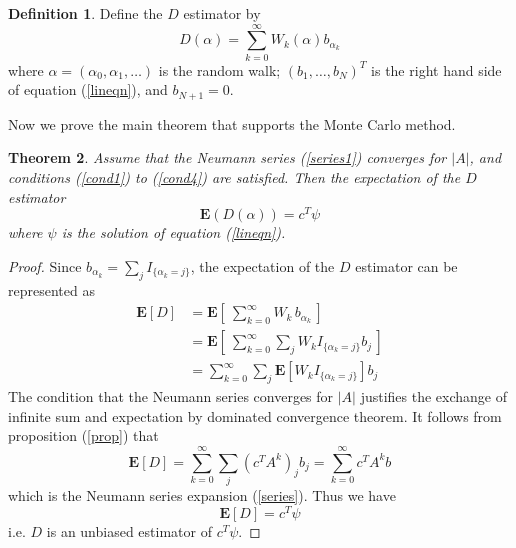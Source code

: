 \documentclass[a4paper,11pt]{article}
\newtheorem{theorem}{Theorem}[section]
\theoremstyle{remark}
\theoremstyle{definition}
\newtheorem{definition}[theorem]{Definition}
\begin{document}
        \begin{definition}
            Define the $D$ estimator by
            \begin{equation} \label{D}
                D(\alpha) = \sum_{k=0}^\infty W_k(\alpha) b_{\alpha_k}
            \end{equation}
            where $\alpha = (\alpha_0,\alpha_1,\ldots)$ is the random walk;
            $(b_1,\ldots,b_N)^T$ is the right hand side of equation
            (\ref{lineqn}), and $b_{N+1} = 0$.
        \end{definition}
        Now we prove the main theorem that supports the Monte Carlo method.
        \begin{theorem} \label{mainthm}
            Assume that the Neumann series (\ref{series1}) converges for $|A|$,
            and conditions (\ref{cond1}) to (\ref{cond4}) are satisfied.
            Then the expectation of the $D$ estimator
            \[ \mathbf{E}( D(\alpha) ) = c^T \psi \]
            where $\psi$ is the solution of equation (\ref{lineqn}).
        \end{theorem}
        \begin{proof}
            Since $b_{\alpha_k} = \sum_j I_{\{\alpha_k=j\}}$, the expectation
            of the $D$ estimator can be represented as
            \[ \begin{split}
                \mathbf{E}[D] &=
                \mathbf{E}\left[ \: \sum_{k=0}^\infty W_k \, b_{\alpha_k}
                               \, \right] \\
                &= \mathbf{E}\left[ \: \sum_{k=0}^\infty
                                \sum_j W_k I_{\{\alpha_k=j\}} b_j \,\right] \\
                &= \sum_{k=0}^\infty \sum_j \mathbf{E}\left[ W_k
                                I_{\{\alpha_k=j\}} \right] b_j
            \end{split} \]
            The condition that the Neumann series converges for $|A|$ justifies
            the exchange of infinite sum and expectation by dominated
            convergence theorem.  It follows from proposition (\ref{prop}) that
            \[ \mathbf{E}[D] = \sum_{k=0}^\infty \sum_j (c^T A^k)_j b_j
                = \sum_{k=0}^\infty c^T A^k b
            \]
            which is the Neumann series expansion (\ref{series}). Thus we have
            \begin{equation}
                \mathbf{E}[D] = c^T \psi
            \end{equation}
            i.e. $D$ is an unbiased estimator of $c^T \psi$.
        \end{proof}
        
\end{document}
